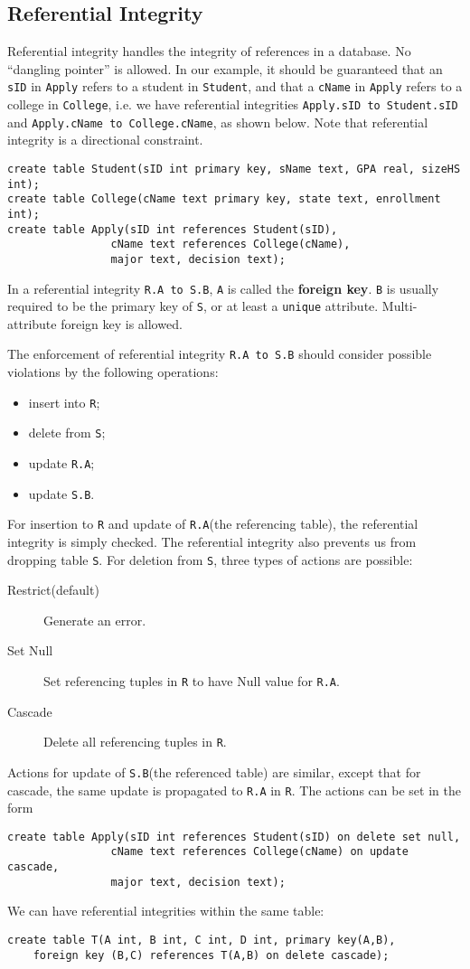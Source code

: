\subsection{Referential Integrity}
Referential integrity handles the integrity of references in a database. No ``dangling pointer'' is allowed. In our example, it should be guaranteed that an \texttt{sID} in \texttt{Apply} refers to a student in \texttt{Student}, and that a \texttt{cName} in \texttt{Apply} refers to a college in \texttt{College}, i.e. we have referential integrities \texttt{Apply.sID to Student.sID} and \texttt{Apply.cName to College.cName}, as shown below. Note that referential integrity is a directional constraint. 
\begin{lstlisting}
create table Student(sID int primary key, sName text, GPA real, sizeHS int);
create table College(cName text primary key, state text, enrollment int);
create table Apply(sID int references Student(sID), 
				cName text references College(cName),
				major text, decision text);
\end{lstlisting}

In a referential integrity \texttt{R.A to S.B}, \texttt{A} is called the \textbf{foreign key}. \texttt{B} is usually required to be the primary key of \texttt{S}, or at least a \texttt{unique} attribute. Multi-attribute foreign key is allowed. 

The enforcement of referential integrity \texttt{R.A to S.B} should consider possible violations by the following operations: 
\begin{itemize}
\item insert into \texttt{R};
\item delete from \texttt{S};
\item update \texttt{R.A};
\item update \texttt{S.B}.
\end{itemize}
For insertion to \texttt{R} and update of \texttt{R.A}(the referencing table), the referential integrity is simply checked. The referential integrity also prevents us from dropping table \texttt{S}. For deletion from \texttt{S}, three types of actions are possible:
\begin{description}
\item[Restrict(default)]Generate an error.
\item[Set Null]Set referencing tuples in \texttt{R} to have Null value for \texttt{R.A}.
\item[Cascade]Delete all referencing tuples in \texttt{R}. 
\end{description}
Actions for update of \texttt{S.B}(the referenced table) are similar, except that for cascade, the same update is propagated to \texttt{R.A} in \texttt{R}. The actions can be set in the form
\begin{lstlisting}
create table Apply(sID int references Student(sID) on delete set null, 
				cName text references College(cName) on update cascade,
				major text, decision text);
\end{lstlisting}
We can have referential integrities within the same table:
\begin{lstlisting}
create table T(A int, B int, C int, D int, primary key(A,B), 
	foreign key (B,C) references T(A,B) on delete cascade);
\end{lstlisting}
